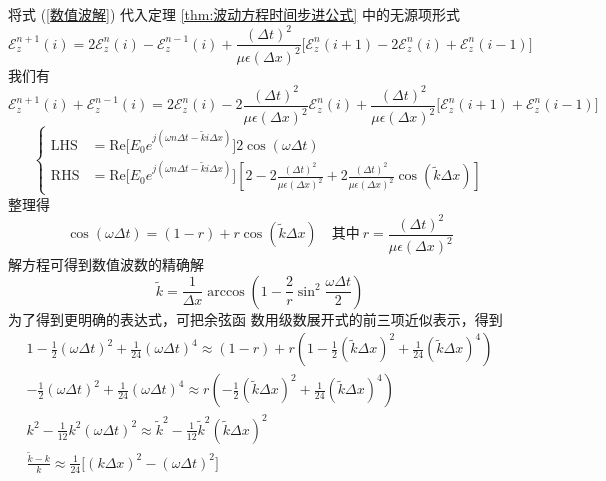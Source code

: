 \begin{solution}
    将式 (\ref{数值波解}) 代入定理 \ref{thm:波动方程时间步进公式} 中的无源项形式
    \begin{equation*}
        \mathscr{E}_z^{n+1}(i)=2\mathscr{E}_z^n(i)-\mathscr{E}_z^{n-1}(i)
        +\frac{(\Delta t)^2}{\mu \epsilon (\Delta x)^2}
        \Big[\mathscr{E}_z^n(i+1)-2\mathscr{E}_z^n(i)+\mathscr{E}_z^n(i-1)\Big]
    \end{equation*}
    我们有
    \begin{equation*}
        \mathscr{E}_z^{n+1}(i)+\mathscr{E}_z^{n-1}(i)=2\mathscr{E}_z^n(i)
        -2\frac{(\Delta t)^2}{\mu \epsilon (\Delta x)^2}\mathscr{E}_z^n(i)
        +\frac{(\Delta t)^2}{\mu \epsilon (\Delta x)^2}
        \Big[\mathscr{E}_z^n(i+1)+\mathscr{E}_z^n(i-1)\Big]
    \end{equation*}
    \begin{equation*}
        \left\{
            \begin{aligned}
                \text{LHS}&=\text{Re}\Big[E_0e^{j(\omega n \Delta t-\tilde{k} i\Delta x)}\Big]
                2\cos(\omega\Delta t)\\
                \text{RHS}&=\text{Re}\Big[E_0e^{j(\omega n \Delta t-\tilde{k} i\Delta x)}\Big]
                \left[2-2\frac{(\Delta t)^2}{\mu \epsilon (\Delta x)^2}+2\frac{(\Delta t)^2}{\mu \epsilon (\Delta x)^2}
                \cos(\tilde{k}\Delta x)\right]
            \end{aligned}
        \right.
    \end{equation*}
    整理得
    \begin{equation*}
        \cos(\omega \Delta t)=(1-r)+r\cos(\tilde{k}\Delta x) 
        \quad \text{其中} \ r=\frac{(\Delta t)^2}{\mu \epsilon (\Delta x)^2}
    \end{equation*}
    解方程可得到数值波数的精确解
    \begin{equation*}
        \tilde{k}=\frac{1}{\Delta x}
        \arccos \left(1-\frac{2}{r}\sin^2 \frac{\omega \Delta t}{2}\right)
    \end{equation*}
    为了得到更明确的表达式，可把余弦函
    数用级数展开式的前三项近似表示，得到
    \begin{gather*}
        1-\frac{1}{2}(\omega \Delta t)^2+\frac{1}{24}(\omega \Delta t)^4
        \approx (1-r)+r\left(1-\frac{1}{2}(\tilde{k} \Delta x)^2
        +\frac{1}{24}(\tilde{k} \Delta x)^4\right)\\
        -\frac{1}{2}(\omega \Delta t)^2+\frac{1}{24}(\omega \Delta t)^4
        \approx r\left(-\frac{1}{2}(\tilde{k} \Delta x)^2
        +\frac{1}{24}(\tilde{k} \Delta x)^4\right)\\
        k^2-\frac{1}{12}k^2(\omega \Delta t)^2 \approx
        \tilde{k}^2-\frac{1}{12}\tilde{k}^2(\tilde{k} \Delta x)^2\\
        \frac{\tilde{k}-k}{k}
        \approx\frac{1}{24}\Big[(k\Delta x)^2-(\omega \Delta t)^2\Big]
    \end{gather*}
\end{solution}

